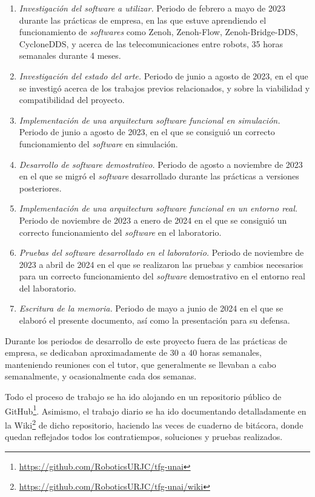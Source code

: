 \begin{enumerate}
    \item{\textit{Investigación del software a utilizar.} Periodo de febrero a
        mayo de 2023 durante las prácticas de empresa, en las que estuve
        aprendiendo el funcionamiento de \textit{softwares} como Zenoh,
        Zenoh-Flow, Zenoh-Bridge-DDS, CycloneDDS, y acerca de las
        telecomunicaciones entre robots, 35 horas semanales durante 4 meses.}
    \item{\textit{Investigación del estado del arte.} Periodo de junio a agosto
        de 2023, en el que se investigó acerca de los trabajos previos
        relacionados, y sobre la viabilidad y compatibilidad del proyecto.}
    \item{\textit{Implementación de una arquitectura software funcional en
        simulación.} Periodo de junio a agosto de 2023, en el que se consiguió
        un correcto funcionamiento del \textit{software} en simulación.}
    \item{\textit{Desarrollo de software demostrativo.} Periodo de agosto a
        noviembre de 2023 en el que se migró el \textit{software} desarrollado
        durante las prácticas a versiones posteriores.}
    \item{\textit{Implementación de una arquitectura software funcional en un
        entorno real.} Periodo de noviembre de 2023 a enero de 2024 en el que se
        consiguió un correcto funcionamiento del \textit{software} en el
        laboratorio.}
    \item{\textit{Pruebas del software desarrollado en el laboratorio.} Periodo
        de noviembre de 2023 a abril de 2024 en el que se realizaron las pruebas
        y cambios necesarios para un correcto funcionamiento del
        \textit{software} demostrativo en el entorno real del laboratorio.}
    \item{\textit{Escritura de la memoria.} Periodo de mayo a junio de 2024 en el
        que se elaboró el presente documento, así como la presentación para su
        defensa.}
\end{enumerate}

Durante los periodos de desarrollo de este proyecto fuera de las prácticas de
empresa, se dedicaban aproximadamente de 30 a 40 horas semanales, manteniendo
reuniones con el tutor, que generalmente se llevaban a cabo semanalmente, y
ocasionalmente cada dos semanas.

Todo el proceso de trabajo se ha ido alojando en un repositorio público de
GitHub\footnote{\url{https://github.com/RoboticsURJC/tfg-unai}}.
Asimismo, el trabajo diario se ha ido documentando detalladamente en la
Wiki\footnote{\url{https://github.com/RoboticsURJC/tfg-unai/wiki}} de dicho
repositorio, haciendo las veces de cuaderno de bitácora, donde quedan reflejados
todos los contratiempos, soluciones y pruebas realizados.


